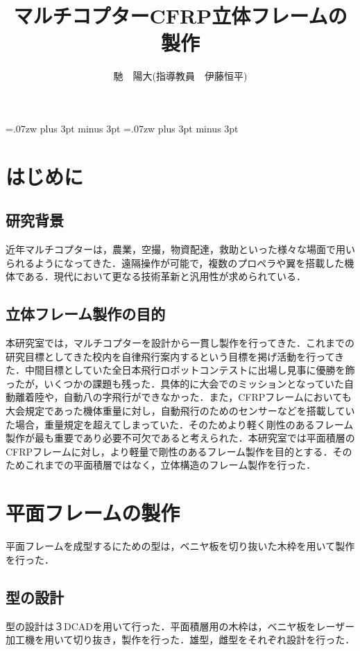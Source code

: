 \documentclass[twocolumn,11pt]{abst}
\title{マルチコプターCFRP立体フレームの製作}
\author{馳　陽大(指導教員　伊藤恒平)}
\begin{document}
\maketitle
\thispagestyle{fancy}
\pagestyle{fancy}

\setlength{\baselineskip}{5.6truemm}
\kanjiskip=.07zw plus 3pt minus 3pt
\xkanjiskip=.07zw plus 3pt minus 3pt



\section{はじめに}
\subsection{研究背景}
近年マルチコプターは，農業，空撮，物資配達，救助といった様々な場面で用いられるようになってきた．遠隔操作が可能で，複数のプロペラや翼を搭載した機体である．現代において更なる技術革新と汎用性が求められている．

\subsection{立体フレーム製作の目的}
本研究室では，マルチコプターを設計から一貫し製作を行ってきた．これまでの研究目標としてきた校内を自律飛行案内するという目標を掲げ活動を行ってきた．中間目標としていた全日本飛行ロボットコンテストに出場し見事に優勝を飾ったが，いくつかの課題も残った．具体的に大会でのミッションとなっていた自動離着陸や，自動八の字飛行ができなかった．また，CFRPフレームにおいても大会規定であった機体重量に対し，自動飛行のためのセンサーなどを搭載していた場合，重量規定を超えてしまっていた．そのためより軽く剛性のあるフレーム製作が最も重要であり必要不可欠であると考えられた．本研究室では平面積層のCFRPフレームに対し，より軽量で剛性のあるフレーム製作を目的とする．そのためこれまでの平面積層ではなく，立体構造のフレーム製作を行った．


\section{平面フレームの製作}
平面フレームを成型するにための型は，ベニヤ板を切り抜いた木枠を用いて製作を行った．

\subsection{型の設計}
型の設計は３DCADを用いて行った．平面積層用の木枠は，ベニヤ板をレーザー加工機を用いて切り抜き，製作を行った．雄型，雌型をそれぞれ設計を行った．
\end{document}
